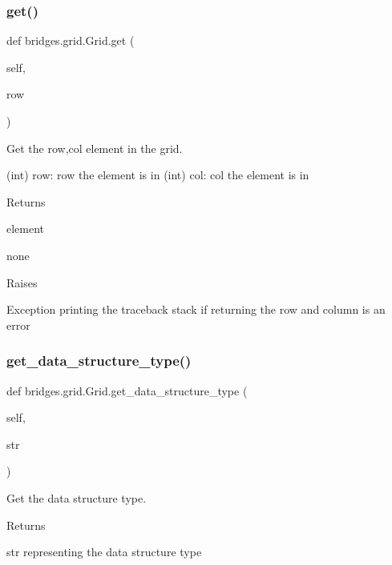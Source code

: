 \subsubsection{\texorpdfstring{get()}{get()}}
{\footnotesize\ttfamily def bridges.\+grid.\+Grid.\+get (\begin{DoxyParamCaption}\item[{}]{self,  }\item[{}]{row }\end{DoxyParamCaption})}



Get the row,col element in the grid. 

(int) row\+: row the element is in (int) col\+: col the element is in \begin{DoxyReturn}{Returns}


element 

none 

Raises 

Exception printing the traceback stack if returning the row and column is an error 
\end{DoxyReturn}
\mbox{\label{classbridges_1_1grid_1_1_grid_ab1a040a486bbad5259fec54fb885eac1}} 
\subsubsection{\texorpdfstring{get\+\_\+data\+\_\+structure\+\_\+type()}{get\_data\_structure\_type()}}
{\footnotesize\ttfamily def bridges.\+grid.\+Grid.\+get\+\_\+data\+\_\+structure\+\_\+type (\begin{DoxyParamCaption}\item[{}]{self,  }\item[{}]{str }\end{DoxyParamCaption})}



Get the data structure type. 

\begin{DoxyReturn}{Returns}


str representing the data structure type 
\end{DoxyReturn}
\mbox{\label{classbridges_1_1grid_1_1_grid_a40d076434ad49fe29f6a931aba9f442b}} 
